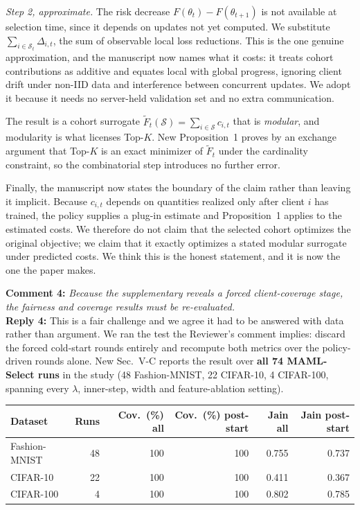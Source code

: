 \documentclass[10pt]{article}
\begin{document}
\emph{Step 2, approximate.} The risk decrease $F(\theta_t)-F(\theta_{t+1})$ is not available at selection time, since it depends on updates not yet computed. We substitute $\sum_{i\in\mathcal{S}_t}\Delta_{i,t}$, the sum of observable local loss reductions. This is the one genuine approximation, and the manuscript now names what it costs: it treats cohort contributions as additive and equates local with global progress, ignoring client drift under non-IID data and interference between concurrent updates. We adopt it because it needs no server-held validation set and no extra communication.

The result is a cohort surrogate $\widetilde{F}_t(\mathcal{S})=\sum_{i\in\mathcal{S}}c_{i,t}$ that is \emph{modular}, and modularity is what licenses Top-$K$. New Proposition~1 proves by an exchange argument that Top-$K$ is an exact minimizer of $\widetilde{F}_t$ under the cardinality constraint, so the combinatorial step introduces no further error.

Finally, the manuscript now states the boundary of the claim rather than leaving it implicit. Because $c_{i,t}$ depends on quantities realized only after client $i$ has trained, the policy supplies a plug-in estimate and Proposition~1 applies to the estimated costs. We therefore do not claim that the selected cohort optimizes the original objective; we claim that it exactly optimizes a stated modular surrogate under predicted costs. We think this is the honest statement, and it is now the one the paper makes.

\vspace{0.5em}
\noindent
\textbf{Comment 4:} \textit{Because the supplementary reveals a forced client-coverage stage, the fairness and coverage results must be re-evaluated.}\\
\noindent
\textbf{Reply 4:} This is a fair challenge and we agree it had to be answered with data rather than argument. We ran the test the Reviewer's comment implies: discard the forced cold-start rounds entirely and recompute both metrics over the policy-driven rounds alone. New Sec.~V-C reports the result over \textbf{all 74 MAML-Select runs} in the study (48 Fashion-MNIST, 22 CIFAR-10, 4 CIFAR-100, spanning every $\lambda$, inner-step, width and feature-ablation setting).

\begin{center}
\begin{tabular}{lrrrrr}
\toprule
Dataset & Runs & Cov.\ (\%) all & Cov.\ (\%) post-start & Jain all & Jain post-start \\
\midrule
Fashion-MNIST & 48 & 100 & 100 & 0.755 & 0.737 \\
CIFAR-10      & 22 & 100 & 100 & 0.411 & 0.367 \\
CIFAR-100     & 4  & 100 & 100 & 0.802 & 0.785 \\
\bottomrule
\end{tabular}
\end{center}
\end{document}
